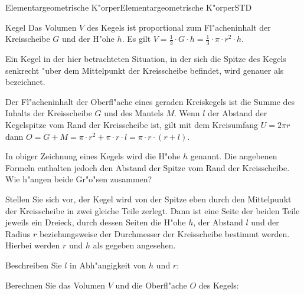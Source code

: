 \begin{MXContent}{Elementargeometrische K"orper}{Elementargeometrische K"orper}{STD}
\begin{MXInfo}{Kegel}
Das Volumen $V$ des Kegels ist proportional zum Fl"acheninhalt der 
Kreisscheibe $G$ und der H"ohe $h$. 
Es gilt $V = \frac{1}{3} \cdot G \cdot h %
 = \frac{1}{3} \cdot \pi \cdot r^2 \cdot h$.

Ein Kegel in der hier betrachteten Situation, in der sich die Spitze des 
Kegels senkrecht "uber dem Mittelpunkt der Kreisscheibe befindet, wird 
genauer als  bezeichnet.

Der Fl"acheninhalt der Oberfl"ache eines geraden Kreiskegels ist die Summe 
des Inhalts der Kreisscheibe $G$ und des Mantels $M$. Wenn $l$ der Abstand der 
Kegelspitze vom Rand der Kreisscheibe ist, 
gilt mit dem Kreisumfang $U =  2 \pi r$ dann
$O = G + M = \pi \cdot r^2 + \pi \cdot r \cdot l %
 = \pi \cdot r \cdot (r + l)$.
\end{MXInfo}

In obiger Zeichnung eines Kegels wird die H"ohe $h$ genannt. Die angebenen 
Formeln enthalten jedoch den Abstand der Spitze vom Rand der Kreisscheibe.
Wie h"angen beide Gr"o"sen zusammen?

\begin{MExercise}
Stellen Sie sich vor, der Kegel wird von der Spitze eben 
durch den Mittelpunkt der Kreisscheibe in zwei gleiche Teile zerlegt.
Dann ist eine Seite der beiden Teile jeweils ein Dreieck, durch dessen Seiten 
die H"ohe $h$, der Abstand $l$ und der Radius $r$ beziehungsweise der 
Durchmesser der Kreisscheibe bestimmt werden.
Hierbei werden $r$ und $h$ als gegeben angesehen.

\begin{MExerciseItems}
\item
Beschreiben Sie $l$ in Abh"angigkeit von $h$ und $r$:
\par
{}

\item
Berechnen Sie das Volumen $V$ und die Oberfl"ache $O$ des Kegels:
\begin{MExerciseItems}
\item %
\item %
\end{MExerciseItems}
\end{MExerciseItems}
\end{MExercise}

\end{MXContent}


